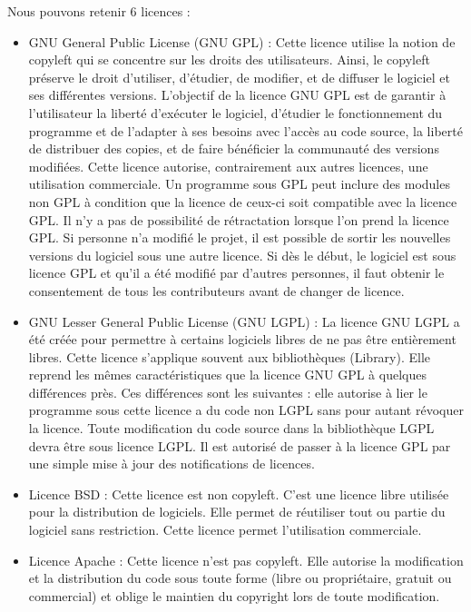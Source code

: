 \documentclass[12pt,a4paper]{article}
\begin{document}
Nous pouvons retenir 6 licences :
\vskip5mm
\begin{itemize}
	\item GNU General Public License (GNU GPL) : Cette licence utilise la notion de copyleft qui se concentre sur les droits des utilisateurs. Ainsi, le copyleft préserve le droit d'utiliser, d'étudier, de modifier, et de diffuser le logiciel et ses différentes versions. L'objectif de la licence GNU GPL est de garantir à l'utilisateur la liberté d'exécuter le logiciel, d'étudier le fonctionnement du programme et de l'adapter à ses besoins avec l'accès au code source, la liberté de distribuer des copies, et de faire bénéficier la communauté des versions modifiées. Cette licence autorise, contrairement aux autres licences, une utilisation commerciale. Un programme sous GPL peut inclure des modules non GPL à condition que la licence de ceux-ci soit compatible avec la licence GPL. Il n'y a pas de possibilité de rétractation lorsque l'on prend la licence GPL. Si personne n'a modifié le projet, il est possible de sortir les nouvelles versions du logiciel sous une autre licence. Si dès le début, le logiciel est sous licence GPL et qu'il a été modifié par d'autres personnes, il faut obtenir le consentement de tous les contributeurs avant de changer de licence.
	\vskip3mm
	\item GNU Lesser General Public License (GNU LGPL) : La licence GNU LGPL a été créée pour permettre à certains logiciels libres de ne pas \^{e}tre entièrement libres. Cette licence s'applique souvent aux bibliothèques (Library). Elle reprend les m\^{e}mes caractéristiques que la licence GNU GPL à quelques différences près. Ces différences sont les suivantes : elle autorise à lier le programme sous cette licence a du code non LGPL sans pour autant révoquer la licence. Toute modification du code source dans la bibliothèque LGPL devra \^{e}tre sous licence LGPL. Il est autorisé de passer à la licence GPL par une simple mise à jour des notifications de licences.
	\vskip3mm
	\item Licence BSD : Cette licence est non copyleft. C'est une licence libre utilisée pour la distribution de logiciels. Elle permet de réutiliser tout ou partie du logiciel sans restriction. Cette licence permet l'utilisation commerciale.
	\vskip3mm	
	\item Licence Apache : Cette licence n'est pas copyleft. Elle autorise la modification et la distribution du code sous toute forme (libre ou propriétaire, gratuit ou commercial) et oblige le maintien du copyright lors de toute modification.

\end{itemize}
\end{document}
